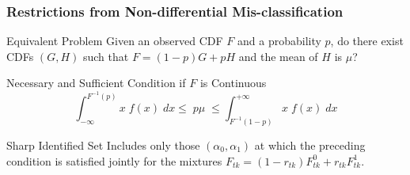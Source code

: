 \documentclass{beamer}
\begin{document}
\begin{frame}[plain]
  \frametitle{Restrictions from Non-differential Mis-classification}

  \begin{block}{Equivalent Problem}
   Given an observed CDF $F$ and a probability $p$, do there exist CDFs $(G,H)$ such that $F = (1-p)G + pH$ and the mean of $H$ is $\mu$? 
  \end{block}

  \begin{alertblock}{Necessary and Sufficient Condition if $F$ is Continuous}
   \[
     \int_{-\infty}^{F^{-1}(p)} x\; f(x) \; dx \leq \; p \mu \; \leq \int_{F^{-1}(1-p)}^{+\infty} x \; f(x)\; dx
   \]
  \end{alertblock}

  \begin{block}{Sharp Identified Set}
    Includes only those $(\alpha_0, \alpha_1)$ at which the preceding condition is satisfied jointly for the mixtures $F_{tk} = (1 - r_{tk})F_{tk}^0 + r_{tk} F_{tk}^1$.
  \hyperlink{SHARP_BODY}{}
  \end{block}



\end{frame}
\end{document}

